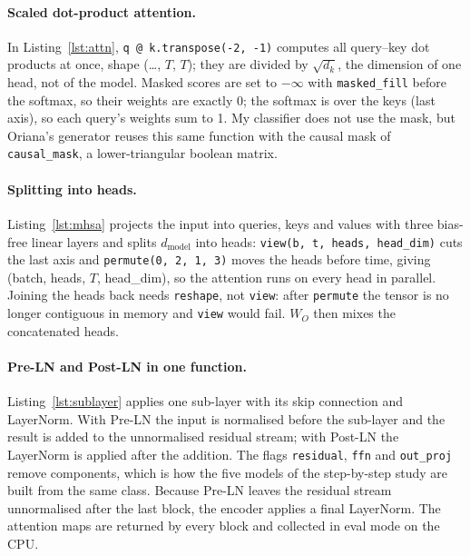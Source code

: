 \paragraph{Scaled dot-product attention.} In Listing~\ref{lst:attn}, \texttt{q @ k.transpose(-2, -1)} computes
all query--key dot products at once, shape (\ldots, $T$, $T$); they are divided by $\sqrt{d_k}$, the dimension
of one head, not of the model. Masked scores are set to $-\infty$ with \texttt{masked\_fill} before the
softmax, so their weights are exactly 0; the softmax is over the keys (last axis), so each query's weights
sum to 1. My classifier does not use the mask, but Oriana's generator reuses this same function with the
causal mask of \texttt{causal\_mask}, a lower-triangular boolean matrix.



\paragraph{Splitting into heads.} Listing~\ref{lst:mhsa} projects the input into queries, keys and values
with three bias-free linear layers and splits $d_\text{model}$ into heads: \texttt{view(b, t, heads,
head\_dim)} cuts the last axis and \texttt{permute(0, 2, 1, 3)} moves the heads before time, giving (batch,
heads, $T$, head\_dim), so the attention runs on every head in parallel. Joining the heads back needs
\texttt{reshape}, not \texttt{view}: after \texttt{permute} the tensor is no longer contiguous in memory and
\texttt{view} would fail. $W_O$ then mixes the concatenated heads.



\paragraph{Pre-LN and Post-LN in one function.} Listing~\ref{lst:sublayer} applies one sub-layer with its
skip connection and LayerNorm. With Pre-LN the input is normalised before the sub-layer and the result is
added to the unnormalised residual stream; with Post-LN the LayerNorm is applied after the addition. The
flags \texttt{residual}, \texttt{ffn} and \texttt{out\_proj} remove components, which is how the five models of
the step-by-step study are built from the same class. Because Pre-LN leaves the residual stream
unnormalised after the last block, the encoder applies a final LayerNorm. The attention maps are returned by
every block and collected in eval mode on the CPU.

